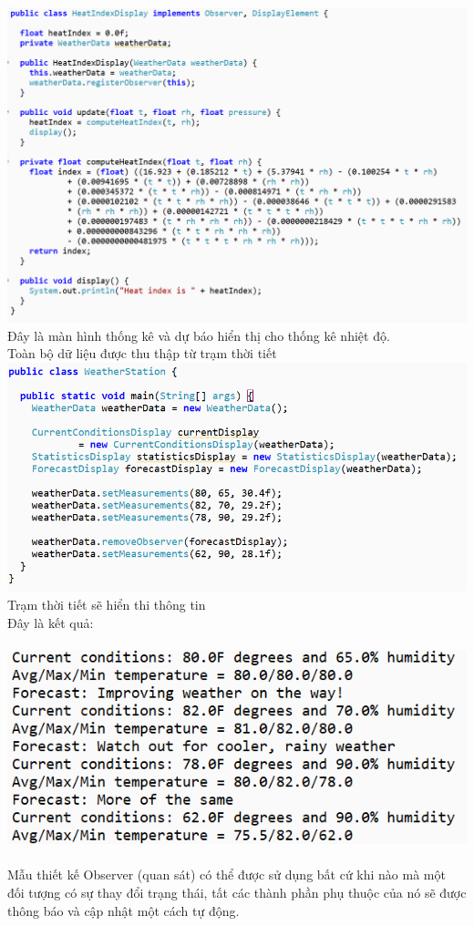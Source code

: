 \includegraphics[width=\columnwidth,height=.5\textheight]{GALLEYS/images/chapter2/images9}\\
Đây là màn hình thống kê và dự báo hiển thị cho thống kê nhiệt độ.\\
Toàn bộ dữ liệu được thu thập từ trạm thời tiết\\
\includegraphics[width=\columnwidth,height=.4\textheight]{GALLEYS/images/chapter2/images10}\\
Trạm thời tiết sẽ hiển thi thông tin\\
Đây là kết quả:\\\\
\includegraphics[width=\columnwidth,height=.3\textheight]{GALLEYS/images/chapter2/images11}\\\\
Mẫu thiết kế Observer (quan sát) có thể được sử dụng bất cứ khi nào mà một đối tượng có sự thay đổi trạng thái, tất các thành phần phụ thuộc của nó sẽ được thông báo và cập nhật một cách tự động.\\


